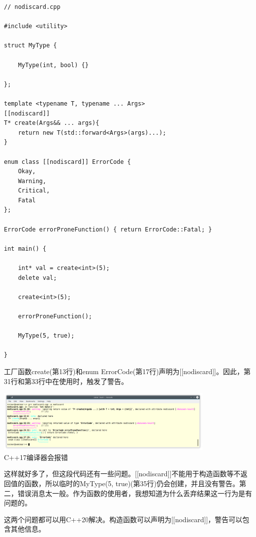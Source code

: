 \begin{lstlisting}[style=styleCXX]
// nodiscard.cpp

#include <utility>

struct MyType {

	MyType(int, bool) {}

};

template <typename T, typename ... Args>
[[nodiscard]]
T* create(Args&& ... args){
	return new T(std::forward<Args>(args)...);
}

enum class [[nodiscard]] ErrorCode {
	Okay,
	Warning,
	Critical,
	Fatal
};

ErrorCode errorProneFunction() { return ErrorCode::Fatal; }

int main() {

	int* val = create<int>(5);
	delete val;
	
	create<int>(5);
	
	errorProneFunction();
	
	MyType(5, true);

}
\end{lstlisting}

工厂函数create(第13行)和enum ErrorCode(第17行)声明为[[nodiscard]]。因此，第31行和第33行中在使用时，触发了警告。

\begin{center}
\includegraphics[width=0.8\textwidth]{content/3/chapter4/images/45.png}\\
C++17编译器会报错
\end{center}

这样就好多了，但这段代码还有一些问题。[[nodiscard]]不能用于构造函数等不返回值的函数，所以临时的MyType(5, true)(第35行)仍会创建，并且没有警告。第二，错误消息太一般。作为函数的使用者，我想知道为什么丢弃结果这一行为是有问题的。

这两个问题都可以用C++20解决。构造函数可以声明为[[nodiscard]]，警告可以包含其他信息。

